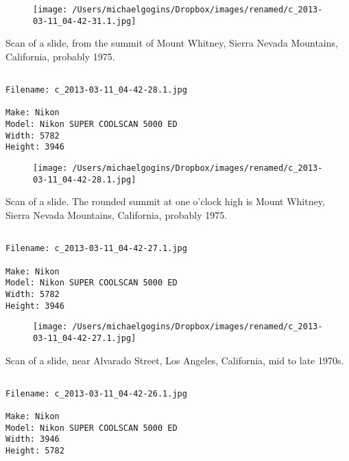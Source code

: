\documentclass[11pt,letter,DIV=14,paper=landscape]{scrbook}
\begin{document}
\begin{figure}
\texttt{[image: /Users/michaelgogins/Dropbox/images/renamed/c\_2013-03-11\_04-42-31.1.jpg]}
\end{figure}
    
\clearpage
\noindent Scan of a slide, from the summit of Mount Whitney, Sierra Nevada Mountains, California, probably 1975.
\noindent
\begin{lstlisting}

Filename: c_2013-03-11_04-42-28.1.jpg

Make: Nikon
Model: Nikon SUPER COOLSCAN 5000 ED
Width: 5782
Height: 3946
\end{lstlisting}
\clearpage

\begin{figure}
\texttt{[image: /Users/michaelgogins/Dropbox/images/renamed/c\_2013-03-11\_04-42-28.1.jpg]}
\end{figure}
    
\clearpage
\noindent Scan of a slide. The rounded summit at one o'clock high is Mount Whitney, Sierra Nevada Mountains, California, probably 1975.
\noindent
\begin{lstlisting}

Filename: c_2013-03-11_04-42-27.1.jpg

Make: Nikon
Model: Nikon SUPER COOLSCAN 5000 ED
Width: 5782
Height: 3946
\end{lstlisting}
\clearpage

\begin{figure}
\texttt{[image: /Users/michaelgogins/Dropbox/images/renamed/c\_2013-03-11\_04-42-27.1.jpg]}
\end{figure}
    
\clearpage
\noindent Scan of a slide, near Alvarado Street, Los Angeles, California, mid to late 1970s.
\noindent
\begin{lstlisting}

Filename: c_2013-03-11_04-42-26.1.jpg

Make: Nikon
Model: Nikon SUPER COOLSCAN 5000 ED
Width: 3946
Height: 5782
\end{lstlisting}
\clearpage
\end{document}
